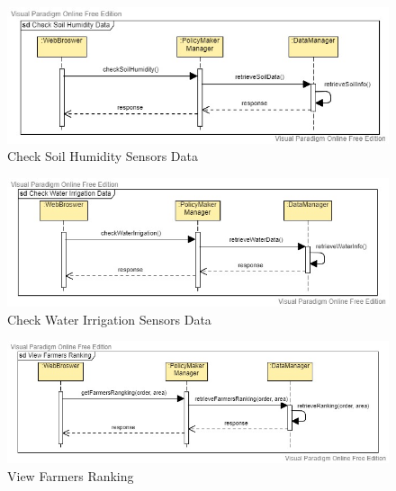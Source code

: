 \documentclass[table, 12pt]{article}
\begin{document}
\begin{center}
    \begin{figure}[H]
        \includegraphics[scale=0.42, center]{assets/SequenceDiagram/Soil.jpg}
        \caption{Check Soil Humidity Sensors Data}
        \label{fig: humidity}
    \end{figure}
\end{center}

\begin{center}
    \begin{figure}[H]
        \includegraphics[scale=0.42, center]{assets/SequenceDiagram/Irrigation.jpg}
        \caption{Check Water Irrigation Sensors Data}
        \label{fig: irrigation}
    \end{figure}
\end{center}

\begin{center}
    \begin{figure}[H]
        \includegraphics[scale=0.42, center]{assets/SequenceDiagram/Ranking.jpg}
        \caption{View Farmers Ranking}
        \label{fig: ranking}
    \end{figure}
\end{center}
\end{document}
